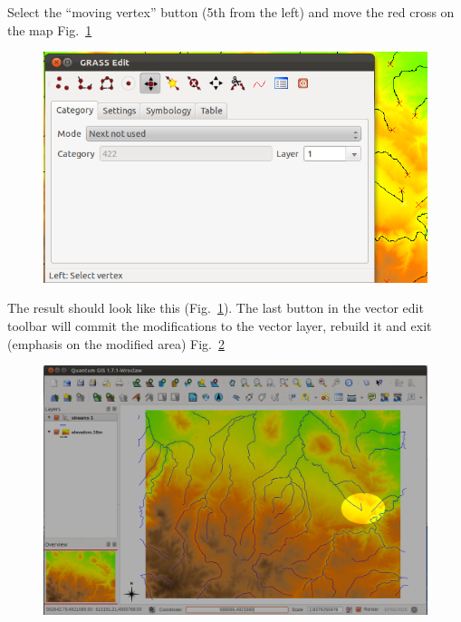 Select the ``moving vertex'' button (5th from the
left) and move the red cross on the map Fig.~\ref{fig:qgis026}

\begin{figure}[htbp]
   \centering
   \includegraphics[scale=0.35]{qgis026.png}
   \caption{}
   \label{fig:qgis026}
\end{figure}

The result should look like this (Fig.~\ref{fig:qgis026}). The last button in the vector edit toolbar will
commit the modifications to the vector layer, rebuild it and exit (emphasis on the modified area) Fig.~\ref{fig:qgis027}

\begin{figure}[htbp]
   \centering
   \includegraphics[scale=0.2]{qgis027.png}
   \caption{}
   \label{fig:qgis027}
\end{figure}

